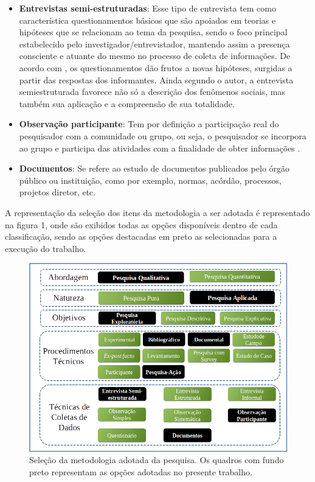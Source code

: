 \begin{itemize}
	\item \textbf{Entrevistas semi-estruturadas}: Esse tipo de entrevista tem  como  característica questionamentos básicos que são apoiados em teorias e hipóteses que se relacionam ao tema da pesquisa, sendo o foco principal estabelecido pelo investigador/entrevistador, mantendo assim a presença consciente e atuante do mesmo no processo de coleta de informações. De acordo com , os questionamentos dão frutos a novas hipóteses, surgidas a partir das respostas dos informantes. Ainda segundo o autor, a entrevista semiestruturada favorece não só a descrição dos fenômenos sociais, mas também sua aplicação e a compreensão de sua totalidade.
	\item \textbf{Observação participante}: Tem por definição a participação real do pesquisador com a comunidade ou grupo, ou seja, o pesquisador se incorpora ao grupo e participa das atividades com a finalidade de obter informações \cite{marconi2010fundamentos}.
	\item \textbf{Documentos}: Se refere ao estudo de documentos publicados pelo órgão público ou instituição, como por exemplo, normas, acórdão, processos, projetos diretor, etc.
\end{itemize}

A representação da seleção dos itens da metodologia a ser adotada é representado na figura 1, onde são exibidos todas as opções disponíveis dentro de cada classificação, sendo as opções destacadas em preto as selecionadas para a execução do trabalho.

\begin{figure}[!htb]
	\centering
	\includegraphics[scale=0.5]{figuras/Metodologia}
	\caption{Seleção da metodologia adotada da pesquisa. Os quadros com fundo preto representam as opções adotadas no presente trabalho.}
\end{figure}


